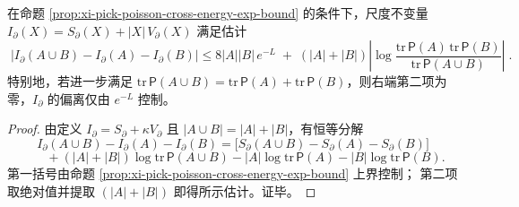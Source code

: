 \begin{corollary}[簇分离下尺度不变量的近可加性]\label{cor:xi-pick-poisson-scale-invariant-near-additivity}
在命题 \ref{prop:xi-pick-poisson-cross-energy-exp-bound} 的条件下，尺度不变量
\(
I_{\partial}(X)=S_{\partial}(X)+|X|\,V_{\partial}(X)
\)
满足估计
\[
\boxed{\;
\bigl|I_{\partial}(A\cup B)-I_{\partial}(A)-I_{\partial}(B)\bigr|
\le 8|A||B|\,e^{-L}
\;+\;(|A|+|B|)\left|\log\frac{\mathrm{tr}\,\mathsf P(A)\,\mathrm{tr}\,\mathsf P(B)}{\mathrm{tr}\,\mathsf P(A\cup B)}\right|\; } .
\]
特别地，若进一步满足 \(\mathrm{tr}\,\mathsf P(A\cup B)=\mathrm{tr}\,\mathsf P(A)+\mathrm{tr}\,\mathsf P(B)\)，则右端第二项为零，\(I_{\partial}\) 的偏离仅由 \(e^{-L}\) 控制。
\end{corollary}
\begin{proof}
由定义
\(
I_{\partial}=S_{\partial}+\kappa V_{\partial}
\)
且 \(|A\cup B|=|A|+|B|\)，有恒等分解
\[
I_{\partial}(A\cup B)-I_{\partial}(A)-I_{\partial}(B)
=\bigl[S_{\partial}(A\cup B)-S_{\partial}(A)-S_{\partial}(B)\bigr]
\]
\[
\qquad
+(|A|+|B|)\log\mathrm{tr}\,\mathsf P(A\cup B)-|A|\log\mathrm{tr}\,\mathsf P(A)-|B|\log\mathrm{tr}\,\mathsf P(B).
\]
第一括号由命题 \ref{prop:xi-pick-poisson-cross-energy-exp-bound} 上界控制；
第二项取绝对值并提取 \((|A|+|B|)\) 即得所示估计。证毕。
\end{proof}

\endinput
